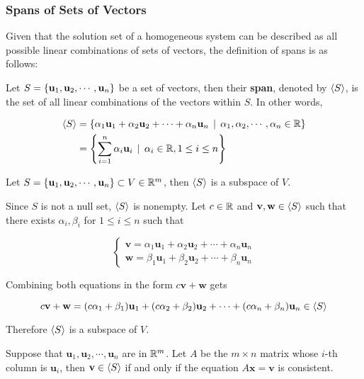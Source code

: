 \documentclass[a4paper,12pt]{article}
\begin{document}
\subsubsection{Spans of Sets of Vectors}
Given that the solution set of a homogeneous system can be described as all possible linear combinations of sets of vectors, the definition of spans is as follows:\n

\begin{dft}
  Let $S=\left\{ \mathbf{u}_{1},\mathbf{u}_{2},\cdots,\mathbf{u}_{n}\right\}$ be a set of vectors, then their \textbf{span}, denoted by $\left\langle S\right\rangle$, is the set of all linear combinations of the vectors within $S$. In other words,

  $$\begin{aligned}[t]
    \left\langle S\right\rangle&=\left\{ \alpha_{1}\mathbf{u}_{1}+\alpha_{2}\mathbf{u}_{2}+\cdots+\alpha_{n}\mathbf{u}_{n}\,\mid\,\alpha_{1},\alpha_{2},\cdots,\alpha_{n}\in\mathbb{R}\right\}\\
    &=\left\{ \sum_{i=1}^{n}\alpha_{i}\mathbf{u}_{i}\,\mid\,\alpha_{i}\in\mathbb{R},1\leq i\leq n\right\}
  \end{aligned}$$
\end{dft}\n

\begin{thm}
  Let $S=\left\{ \mathbf{u}_{1},\mathbf{u}_{2},\cdots,\mathbf{u}_{n}\right\}\subset V\in\mathbb{R}^{m}$, then $\left\langle S\right\rangle$ is a subspace of $V$.\n

  \prf Since $S$ is not a null set, $\left\langle S\right\rangle$ is nonempty. Let $c\in\mathbb{R}$ and $\mathbf{v},\mathbf{w}\in\left\langle S\right\rangle$ such that there exists $\alpha_{i},\beta_{i}$ for $1\leq i\leq n$ such that

  $$\begin{cases}
    \mathbf{v}=\alpha_{1}\mathbf{u}_{1}+\alpha_{2}\mathbf{u}_{2}+\cdots+\alpha_{n}\mathbf{u}_{n}\\
    \mathbf{w}=\beta_{1}\mathbf{u}_{1}+\beta_{2}\mathbf{u}_{2}+\cdots+\beta_{n}\mathbf{u}_{n}
  \end{cases}$$\s

  Combining both equations in the form $c\mathbf{v}+\mathbf{w}$ gets

  $$c\mathbf{v}+\mathbf{w}=(c\alpha_{1}+\beta_{1})\mathbf{u}_{1}+(c\alpha_{2}+\beta_{2})\mathbf{u}_{2}+\cdots+(c\alpha_{n}+\beta_{n})\mathbf{u}_{n}\in\left\langle S\right\rangle$$\s

  Therefore $\left\langle S\right\rangle$ is a subspace of $V$.
\end{thm}\n

\begin{thm}
  Suppose that $\mathbf{u}_{1},\mathbf{u}_{2},\cdots,\mathbf{u}_{n}$ are in $\mathbb{R}^{m}$. Let $A$ be the $m\times n$ matrix whose $i$-th column is $\mathbf{u}_{i}$, then $\mathbf{v}\in\left\langle S\right\rangle$ if and only if the equation $A\mathbf{x}=\mathbf{v}$ is consistent.
\end{thm}\n
\end{document}
